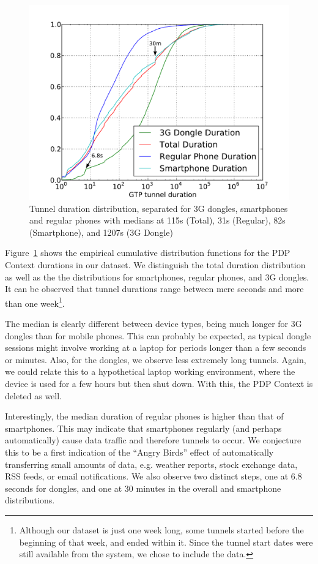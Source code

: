 \begin{figure}
	\centering
	\includegraphics[width=\columnwidth]{images/IMC2013/tunnel-dur-class-cdf-mod.pdf}
	\caption{Tunnel duration distribution, separated for 3G dongles, smartphones and regular phones with medians at 115s (Total), 31s (Regular), 82s (Smartphone), and 1207s (3G Dongle)}
	\label{fig:cdf-duration-device-class}
\end{figure}

Figure~\ref{fig:cdf-duration-device-class} shows the empirical cumulative distribution functions for the PDP Context durations in our dataset. We distinguish the total duration distribution as well as the the distributions for smartphones, regular phones, and 3G dongles. It can be observed that tunnel durations range between mere seconds and more than one week\footnote{Although our dataset is just one week long, some tunnels started before the beginning of that week, and ended within it. Since the tunnel start dates were still available from the system, we chose to include the data.}.

The median is clearly different between device types, being much longer for 3G dongles than for mobile phones. This can probably be expected, as typical dongle sessions might involve working at a laptop for periods longer than a few seconds or minutes. Also, for the dongles, we observe less extremely long tunnels. Again, we could relate this to a hypothetical laptop working environment, where the device is used for a few hours but then shut down. With this, the PDP Context is deleted as well. 

Interestingly, the median duration of regular phones is higher than that of smartphones. This may indicate that smartphones regularly (and perhaps automatically) cause data traffic and therefore tunnels to occur. We conjecture this to be a first indication of the ``Angry Birds'' effect of automatically transferring small amounts of data, e.g. weather reports, stock exchange data, RSS feeds, or email notifications. We also observe two distinct steps, one at 6.8 seconds for dongles, and one at 30 minutes in the overall and smartphone distributions.


